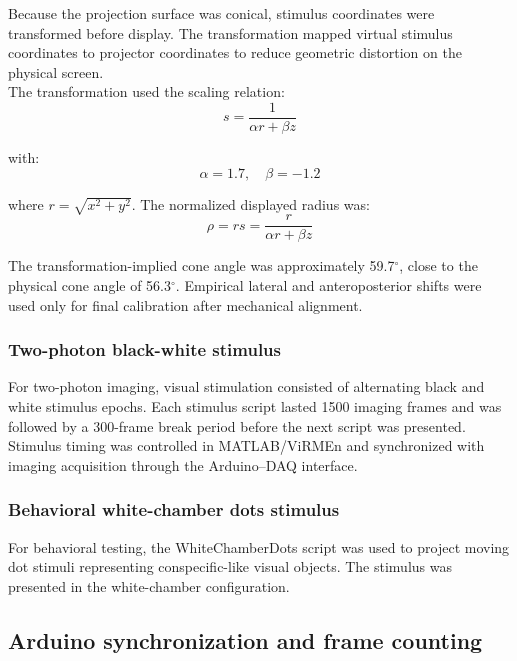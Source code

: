 Because the projection surface was conical, stimulus coordinates were transformed before display. The transformation mapped virtual stimulus coordinates to projector coordinates to reduce geometric distortion on the physical screen.\\

The transformation used the scaling relation:\\

\[
s = \frac{1}{\alpha r + \beta z}
\]

with:\\

\[
\alpha = 1.7, \quad \beta = -1.2
\]

where $r = \sqrt{x^2 + y^2}$. The normalized displayed radius was:\\

\[
\rho = rs = \frac{r}{\alpha r + \beta z}
\]

The transformation-implied cone angle was approximately 59.7$^\circ$, close to the physical cone angle of 56.3$^\circ$. Empirical lateral and anteroposterior shifts were used only for final calibration after mechanical alignment.\\

\subsubsection{Two-photon black-white stimulus}

For two-photon imaging, visual stimulation consisted of alternating black and white stimulus epochs. Each stimulus script lasted 1500 imaging frames and was followed by a 300-frame break period before the next script was presented. Stimulus timing was controlled in MATLAB/ViRMEn and synchronized with imaging acquisition through the Arduino--DAQ interface.\\

\subsubsection{Behavioral white-chamber dots stimulus}

For behavioral testing, the WhiteChamberDots script was used to project moving dot stimuli representing conspecific-like visual objects. The stimulus was presented in the white-chamber configuration.\\

\subsection{Arduino synchronization and frame counting}


